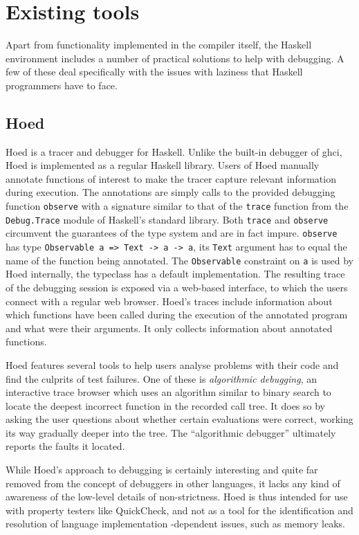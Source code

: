 \documentclass[thesis=B,english]{FITthesis}[2019/12/23]
\newcommand{\hsType}[1]{\texttt{#1}}
\newcommand{\hsIdent}[1]{\texttt{#1}}
\newcommand{\hsModule}[1]{\texttt{#1}}
\begin{document}
\section{Existing tools} \label{sec:existing-tools}
Apart from functionality implemented in the compiler itself, the Haskell
environment includes a number of practical solutions to help with debugging. A
few of these deal specifically with the issues with laziness that Haskell
programmers have to face.

\subsection*{Hoed} \label{sec:hoed}
Hoed\cite{gh-hoed} is a tracer and debugger for Haskell. Unlike the built-in
debugger of \acrshort{ghci}, Hoed is implemented as a regular Haskell library.
Users of Hoed manually annotate functions of interest to make the tracer
capture relevant information during execution. The annotations are simply calls
to the provided debugging function \hsIdent{observe} with a signature similar
to that of the \hsIdent{trace} function from the \hsModule{Debug.Trace} module
of Haskell's standard library. Both \hsIdent{trace} and \hsIdent{observe}
circumvent the guarantees of the type system and are in fact impure.
\hsIdent{observe} has type \hsType{Observable a => Text -> a -> a}, its
\hsType{Text} argument has to equal the name of the function being annotated.
The \hsType{Observable} constraint on \hsType{a} is used by Hoed internally,
the typeclass has a default implementation. The resulting trace of the
debugging session is exposed via a web-based interface, to which the users
connect with a regular web browser. Hoed's traces include information about
which functions have been called during the execution of the annotated program
and what were their arguments. It only collects information about annotated
functions.

Hoed features several tools to help users analyse problems with their code and
find the culprits of test failures. One of these is \textit{algorithmic
debugging}, an interactive trace browser which uses an algorithm similar to
binary search to locate the deepest incorrect function in the recorded call
tree. It does so by asking the user questions about whether certain evaluations
were correct, working its way gradually deeper into the tree. The ``algorithmic
debugger'' ultimately reports the faults it located.

While Hoed's approach to debugging is certainly interesting and quite far
removed from the concept of debuggers in other languages, it lacks any kind of
awareness of the low-level details of non-strictness. Hoed is thus intended for
use with property testers like QuickCheck\cite{quickcheck-paper}, and not as a
tool for the identification and resolution of language implementation
-dependent issues, such as memory leaks.
\end{document}
